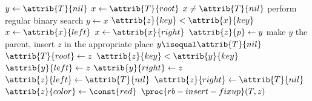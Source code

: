 \documentclass[12pt]{article}
\begin{document}
\begin{codebox}
\li $y \gets{\attrib{T}{nil}}$
\li $x \gets{\attrib{T}{root}}$
\li \While $x \neq \attrib{T}{nil}$ \Comment perform regular binary search
    \Do
\li     $y \gets{x}$
\li     \If $\attrib{z}{key} < \attrib{x}{key}$
\li     \Then
            $x \gets{\attrib{x}{left}}$
\li     \Else
\li         $x \gets{\attrib{x}{right}}$
        \End
    \End
\li $\attrib{z}{p} \gets{y}$ \Comment make $y$ the parent, insert $z$ in the appropriate place
\li \If $y \isequal \attrib{T}{nil}$
\li \Then
        $\attrib{T}{root} \gets{z}$
\li \ElseIf $\attrib{z}{key} < \attrib{y}{key}$
\li \Then
        $\attrib{y}{left} \gets{z}$
\li \Else
\li     $\attrib{y}{right} \gets{z}$
    \End
\li $\attrib{z}{left} \gets{\attrib{T}{nil}}$
\li $\attrib{z}{right} \gets{\attrib{T}{nil}}$
\li $\attrib{z}{color} \gets{\const{red}}$
\li $\proc{rb-insert-fixup}(T, z)$
\end{codebox}
\end{document}
